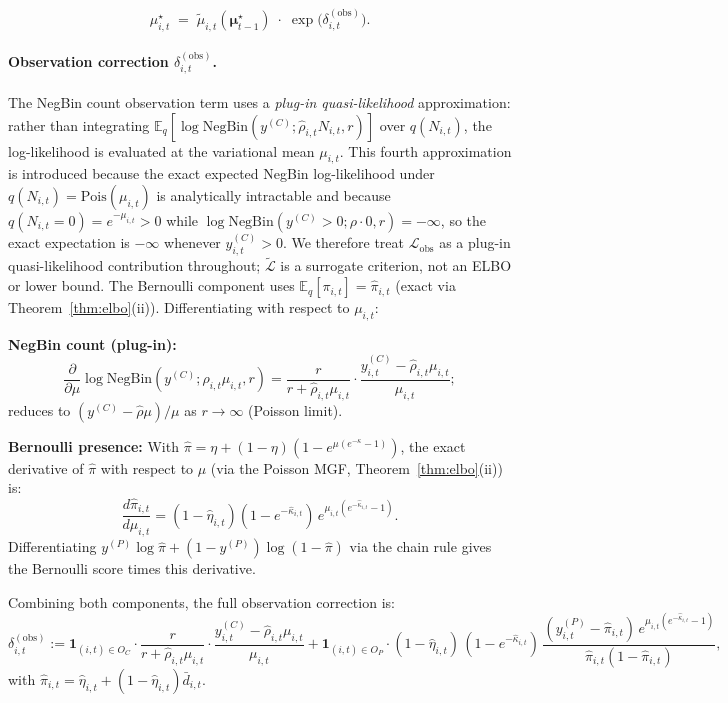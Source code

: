 \documentclass[review,12pt]{elsarticle}
\theoremstyle{definition}
\begin{document}
\begin{equation}\label{eq:cavi-fp}
\mu_{i,t}^{\star}
\;=\;
\tilde\mu_{i,t}\!\left(\boldsymbol{\mu}_{t-1}^{\star}\right)
\;\cdot\;
\exp\!\bigl(\delta_{i,t}^{(\mathrm{obs})}\bigr).
\end{equation}

\paragraph{Observation correction $\delta_{i,t}^{(\mathrm{obs})}$.}
The NegBin count observation term uses a \emph{plug-in quasi-likelihood}
approximation: rather than integrating $\mathbb{E}_q[\log\mathrm{NegBin}(y^{(C)};
\hat\rho_{i,t}N_{i,t},r)]$ over $q(N_{i,t})$, the log-likelihood is evaluated
at the variational mean $\mu_{i,t}$.  This fourth approximation is introduced
because the exact expected NegBin log-likelihood under $q(N_{i,t})=\mathrm{Pois}(\mu_{i,t})$
is analytically intractable and because $q(N_{i,t}=0)=e^{-\mu_{i,t}}>0$
while $\log\mathrm{NegBin}(y^{(C)}>0;\rho\cdot0,r)=-\infty$, so the exact
expectation is $-\infty$ whenever $y^{(C)}_{i,t}>0$.
We therefore treat $\mathcal{L}_\mathrm{obs}$ as a plug-in quasi-likelihood
contribution throughout; $\tilde{\mathcal{L}}$ is a surrogate criterion, not an
ELBO or lower bound.  The Bernoulli component uses
$\mathbb{E}_q[\pi_{i,t}]=\hat\pi_{i,t}$ (exact via Theorem~\ref{thm:elbo}(ii)).
Differentiating with respect to $\mu_{i,t}$:

\textbf{NegBin count (plug-in):}
\[
\frac{\partial}{\partial\mu}\log\mathrm{NegBin}(y^{(C)};\hat\rho_{i,t}\mu_{i,t},r)
=\frac{r}{r+\hat\rho_{i,t}\mu_{i,t}}\cdot
 \frac{y^{(C)}_{i,t}-\hat\rho_{i,t}\mu_{i,t}}{\mu_{i,t}};
\]
reduces to $(y^{(C)}-\hat\rho\mu)/\mu$ as $r\to\infty$ (Poisson limit).

\textbf{Bernoulli presence:} With $\hat\pi=\eta+(1-\eta)(1-e^{\mu(e^{-\kappa}-1)})$,
the exact derivative of $\hat\pi$ with respect to $\mu$ (via the Poisson MGF,
Theorem~\ref{thm:elbo}(ii)) is:
\[
\frac{d\hat\pi_{i,t}}{d\mu_{i,t}}
=(1-\hat\eta_{i,t})(1-e^{-\hat\kappa_{i,t}})\,e^{\mu_{i,t}(e^{-\hat\kappa_{i,t}}-1)}.
\]
Differentiating $y^{(P)}\log\hat\pi+(1-y^{(P)})\log(1-\hat\pi)$ via the
chain rule gives the Bernoulli score times this derivative.

Combining both components, the full observation correction is:
\begin{equation}\label{eq:obs-corr}
\delta_{i,t}^{(\mathrm{obs})}
:=
\mathbf{1}_{(i,t)\in O_C}\cdot
\frac{r}{r+\hat\rho_{i,t}\mu_{i,t}}\cdot
\frac{y^{(C)}_{i,t}-\hat\rho_{i,t}\mu_{i,t}}{\mu_{i,t}}
+
\mathbf{1}_{(i,t)\in O_P}\cdot
(1-\hat\eta_{i,t})\,(1-e^{-\hat\kappa_{i,t}})\,
\frac{(y^{(P)}_{i,t}-\hat\pi_{i,t})\,
      e^{\mu_{i,t}(e^{-\hat\kappa_{i,t}}-1)}}
     {\hat\pi_{i,t}(1-\hat\pi_{i,t})},
\end{equation}
with $\hat\pi_{i,t}=\hat\eta_{i,t}+(1-\hat\eta_{i,t})\bar{d}_{i,t}$.
\end{document}
